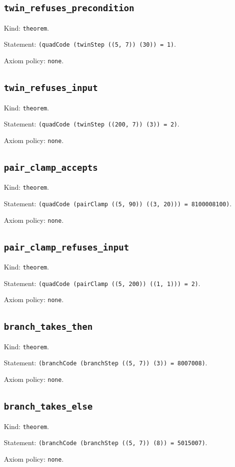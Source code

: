 \documentclass[11pt]{article}
\begin{document}
\subsection*{\texttt{twin\_refuses\_precondition}}
\noindent Kind: \texttt{theorem}.\par
\noindent Statement: \texttt{(quadCode (twinStep ((5, 7)) (30)) = 1)}.\par
\noindent Axiom policy: \texttt{none}.\par
\subsection*{\texttt{twin\_refuses\_input}}
\noindent Kind: \texttt{theorem}.\par
\noindent Statement: \texttt{(quadCode (twinStep ((200, 7)) (3)) = 2)}.\par
\noindent Axiom policy: \texttt{none}.\par
\subsection*{\texttt{pair\_clamp\_accepts}}
\noindent Kind: \texttt{theorem}.\par
\noindent Statement: \texttt{(quadCode (pairClamp ((5, 90)) ((3, 20))) = 8100008100)}.\par
\noindent Axiom policy: \texttt{none}.\par
\subsection*{\texttt{pair\_clamp\_refuses\_input}}
\noindent Kind: \texttt{theorem}.\par
\noindent Statement: \texttt{(quadCode (pairClamp ((5, 200)) ((1, 1))) = 2)}.\par
\noindent Axiom policy: \texttt{none}.\par
\subsection*{\texttt{branch\_takes\_then}}
\noindent Kind: \texttt{theorem}.\par
\noindent Statement: \texttt{(branchCode (branchStep ((5, 7)) (3)) = 8007008)}.\par
\noindent Axiom policy: \texttt{none}.\par
\subsection*{\texttt{branch\_takes\_else}}
\noindent Kind: \texttt{theorem}.\par
\noindent Statement: \texttt{(branchCode (branchStep ((5, 7)) (8)) = 5015007)}.\par
\noindent Axiom policy: \texttt{none}.\par
\end{document}
